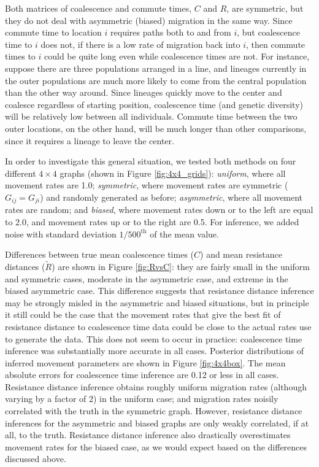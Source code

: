 \documentclass{article}
\newcommand{\comdist}{\widetilde{R}}
\begin{document}
Both matrices of coalescence and commute times, $C$ and $R$, are symmetric,
but they do not deal with asymmetric (biased) migration in the same way.
Since commute time to location $i$ requires paths both to and from $i$,
but coalescence time to $i$ does not,
if there is a low rate of migration back into $i$,
then commute times to $i$ could be quite long even while coalescence times are not.
For instance, suppose there are three populations arranged in a line,
and lineages currently in the outer populations are much more likely to come from the central population
than the other way around.
Since lineages quickly move to the center and coalesce regardless of starting position,
coalescence time (and genetic diversity) will be relatively low between all individuals.
Commute time between the two outer locations, on the other hand,
will be much longer than other comparisons, since it requires a lineage to leave the center.

In order to investigate this general situation,
we tested both methods on four different $4 \times 4$ graphs (shown in Figure \ref{fig:4x4_grids}):
\emph{uniform}, where all movement rates are 1.0;
\emph{symmetric}, where movement rates are symmetric ($G_{ij} = G_{ji}$)
and randomly generated as before;
\emph{asymmetric}, where all movement rates are random;
and \emph{biased}, where movement rates down or to the left are equal to 2.0,
and movement rates up or to the right are 0.5.
For inference, we added noise with standard deviation $1/500^\text{th}$ of the mean value.

Differences between true mean coalescence times ($C$) and mean resistance distances ($\comdist$) 
are shown in Figure \ref{fig:RvsC}:
they are fairly small in the uniform and symmetric cases, moderate in the asymmetric case, 
and extreme in the biased asymmetric case.
This difference suggests that resistance distance inference may be strongly misled 
in the asymmetric and biased situations,
but in principle it still could be the case that 
the movement rates that give the best fit of resistance distance
to coalescence time data could be close to the actual rates use to generate the data.
This does not seem to occur in practice:
coalescence time inference was substantially more accurate in all cases.
Posterior distributions of inferred movement parameters are shown in Figure \ref{fig:4x4box}.
The mean absolute errors for coalescence time inference are 0.12 or less in all cases.
Resistance distance inference obtains roughly uniform migration rates
(although varying by a factor of 2) in the uniform case;
and migration rates noisily correlated with the truth in the symmetric graph.
However, resistance distance inferences for the asymmetric and biased graphs are only weakly correlated, 
if at all, to the truth.
Resistance distance inference also drastically overestimates movement rates for the biased case,
as we would expect based on the differences discussed above.
\end{document}
